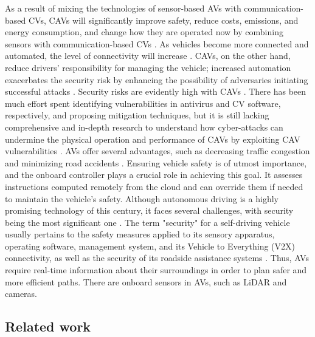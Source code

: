 \documentclass[a4paper,12pt]{article}
\begin{document}
As a result of mixing the technologies of sensor-based AVs with communication-based CVs, CAVs will significantly improve safety, reduce costs, emissions, and energy consumption, and change how they are operated now by combining sensors with communication-based CVs \cite{article5}. As vehicles become more connected and automated, the level of connectivity will increase \cite{article5}. CAVs, on the other hand, reduce drivers' responsibility for managing the vehicle; increased automation exacerbates the security risk by enhancing the possibility of adversaries initiating successful attacks \cite{article5}. Security risks are evidently high with CAVs \cite{article5}. There has been much effort spent identifying vulnerabilities in antivirus and CV software, respectively, and proposing mitigation techniques, but it is still lacking comprehensive and in-depth research to understand how cyber-attacks can undermine the physical operation and performance of CAVs by exploiting CAV vulnerabilities \cite{article5}. AVs offer several advantages, such as decreasing traffic congestion and minimizing road accidents \cite{article1}. Ensuring vehicle safety is of utmost importance, and the onboard controller plays a crucial role in achieving this goal. It assesses instructions computed remotely from the cloud and can override them if needed to maintain the vehicle's safety. Although autonomous driving is a highly promising technology of this century, it faces several challenges, with security being the most significant one \cite{article1}. The term "security" for a self-driving vehicle usually pertains to the safety measures applied to its sensory apparatus, operating software, management system, and its Vehicle to Everything (V2X) connectivity, as well as the security of its roadside assistance systems \cite{article1}. Thus, AVs require real-time information about their surroundings in order to plan safer and more efficient paths. There are onboard sensors in AVs, such as LiDAR and cameras.


\subsection{Related work}
\end{document}
